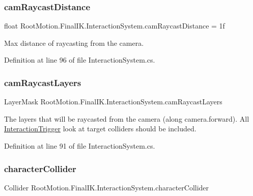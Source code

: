 \subsubsection{\texorpdfstring{cam\+Raycast\+Distance}{camRaycastDistance}}
{\footnotesize\ttfamily float Root\+Motion.\+Final\+I\+K.\+Interaction\+System.\+cam\+Raycast\+Distance = 1f}



Max distance of raycasting from the camera. 



Definition at line 96 of file Interaction\+System.\+cs.

\mbox{\label{class_root_motion_1_1_final_i_k_1_1_interaction_system_aabd7d1c80c5fe0c7251823039468ccee}} 
\subsubsection{\texorpdfstring{cam\+Raycast\+Layers}{camRaycastLayers}}
{\footnotesize\ttfamily Layer\+Mask Root\+Motion.\+Final\+I\+K.\+Interaction\+System.\+cam\+Raycast\+Layers}



The layers that will be raycasted from the camera (along camera.\+forward). All \mbox{\hyperlink{class_root_motion_1_1_final_i_k_1_1_interaction_trigger}{Interaction\+Trigger}} look at target colliders should be included. 



Definition at line 91 of file Interaction\+System.\+cs.

\mbox{\label{class_root_motion_1_1_final_i_k_1_1_interaction_system_ab5b6cdaae10a8196fa6ed2d7e7859220}} 
\subsubsection{\texorpdfstring{character\+Collider}{characterCollider}}
{\footnotesize\ttfamily Collider Root\+Motion.\+Final\+I\+K.\+Interaction\+System.\+character\+Collider}



